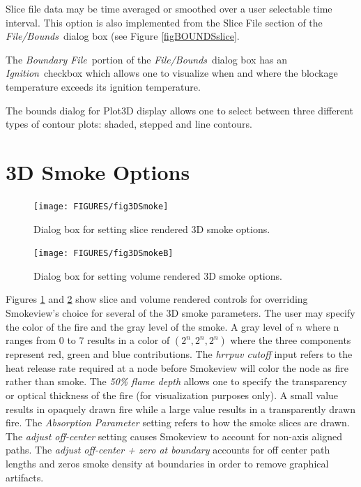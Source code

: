 \documentclass[11pt,twoside]{book}
\begin{document}
Slice file data may be time averaged or smoothed over a user
selectable time interval.  This option is also implemented from
the Slice File section of the {\em File/Bounds}\ dialog box (see
Figure \ref{figBOUNDSslice}.

The {\em Boundary File}\ portion of the {\em File/Bounds}\ dialog
box has an {\em Ignition}\ checkbox which allows one to visualize
when and where the blockage temperature exceeds its ignition
temperature.

The bounds dialog for Plot3D display allows one to select between
three different types of contour plots:  shaded, stepped and line
contours.
\section{3D Smoke Options}
\begin{figure}[\figoptions]
\centerline{\texttt{[image: FIGURES/fig3DSmoke]}
} \caption[Dialog Box for setting slice rendered 3D smoke options]
{Dialog box for setting slice rendered 3D smoke options.   }
\label{fig3DSmoke}
\end{figure}
\begin{figure}[\figoptions]
\centerline{\texttt{[image: FIGURES/fig3DSmokeB]}
} \caption[Dialog Box for setting volume rendered 3D smoke
options] {Dialog box for setting volume rendered 3D smoke options.
} \label{fig3DSmokeB}
\end{figure}
Figures \ref{fig3DSmoke} and \ref{fig3DSmokeB} show slice and
volume rendered controls for overriding Smokeview's choice for
several of the 3D smoke parameters.  The user may specify the
color of the fire and the gray level of the smoke.  A gray level
of $n$ where n ranges from 0 to 7 results in a color of
$(2^n,2^n,2^n)$ where the three components represent red, green
and blue contributions.  The {\em hrrpuv cutoff} input refers to
the heat release rate required at a node before Smokeview will
color the node as fire rather than smoke. The {\em 50\% flame
depth} allows one to specify the transparency or optical thickness
of the fire (for visualization purposes only). A small value
results in opaquely drawn fire while a large value results in a
transparently drawn fire. The {\em Absorption Parameter} setting
refers to how the smoke slices are drawn.  The {\em adjust
off-center} setting causes Smokeview to account for non-axis
aligned paths. The {\em adjust off-center + zero at boundary}
accounts for off center path lengths and zeros smoke density at
boundaries in order to remove graphical artifacts.
\end{document}
